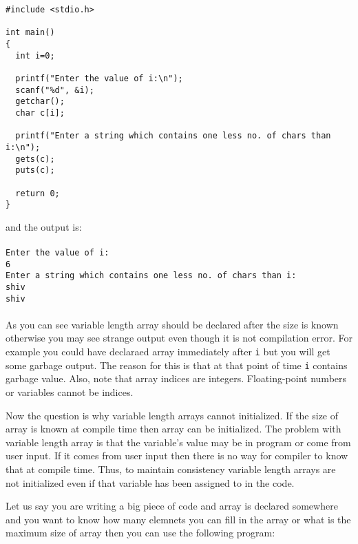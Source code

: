 \begin{verbatim}
#include <stdio.h>

int main()
{
  int i=0;

  printf("Enter the value of i:\n");
  scanf("%d", &i);
  getchar();
  char c[i];

  printf("Enter a string which contains one less no. of chars than i:\n");
  gets(c);
  puts(c);

  return 0;
}
\end{verbatim}
and the output is:
\\\\\texttt{Enter the value of i:\\
6\\
Enter a string which contains one less no. of chars than i:\\
shiv\\
shiv\\\\}
As you can see variable length array should be declared after the size is known
otherwise you may see strange output even though it is not compilation
error. For example you could have declaraed array immediately after \texttt{i}
but you will get some garbage output. The reason for this is that at that point
of time \texttt{i} contains garbage value. Also, note that array indices are
integers. Floating-point numbers or variables cannot be indices.

Now the question is why variable length arrays cannot initialized. If the size
of array is known at compile time then array can be initialized. The problem
with variable length array is that the variable's value may be in program or
come from user input. If it comes from user input then there is no way for
compiler to know that at compile time. Thus, to maintain consistency variable
length arrays are not initialized even if that variable has been assigned to in
the code.

Let us say you are writing a big piece of code and array is declared somewhere
and you want to know how many elemnets you can fill in the array or what is the
maximum size of array then you can use the following program:

